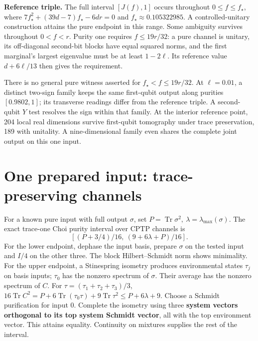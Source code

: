 \documentclass[
  10pt,
  a4paper,
]{article}
\begin{document}
\textbf{Reference triple.} The full interval \([J(f),1]\) occurs throughout \(0\le f\le f_\star\), where \(7f_\star^2+(39d-7)f_\star-6dr=0\) and \(f_\star\approx0.105322985\). A controlled-unitary construction attains the pure endpoint in this range. Some ambiguity survives throughout \(0<f<r\). Purity one requires \(f\le19r/32\): a pure channel is unitary, its off-diagonal second-bit blocks have equal squared norms, and the first marginal's largest eigenvalue must be at least \(1-2\ell\). Its reference value \(d+6\ell/13\) then gives the requirement.

There is no general pure witness asserted for \(f_\star<f\le19r/32\). At \(\ell=0.01\), a distinct two-sign family keeps the same first-qubit output along purities \([0.9802,1]\); its transverse readings differ from the reference triple. A second-qubit \(Y\) test resolves the sign within that family. At the interior reference point, 204 local real dimensions survive first-qubit tomography under trace preservation, 189 with unitality. A nine-dimensional family even shares the complete joint output on this one input.

\newpage

\section{One prepared input: trace-preserving channels}\label{one-prepared-input-trace-preserving-channels}

For a known pure input with full output \(\sigma\), set \(P=\operatorname{Tr}\sigma^2,\ \lambda=\lambda_{\max}(\sigma)\). The exact trace-one Choi purity interval over CPTP channels is \[
 [(P+3/4)/16,\ (9+6\lambda+P)/16].
\] For the lower endpoint, dephase the input basis, prepare \(\sigma\) on the tested input and \(I/4\) on the other three. The block Hilbert--Schmidt norm shows minimality. For the upper endpoint, a Stinespring isometry produces environmental states \(\tau_j\) on basis inputs; \(\tau_0\) has the nonzero spectrum of \(\sigma\). Their average has the nonzero spectrum of \(C\). For \(\tau=(\tau_1+\tau_2+\tau_3)/3\), \(16\operatorname{Tr}C^2=P+6\operatorname{Tr}(\tau_0\tau)+9\operatorname{Tr}\tau^2\le P+6\lambda+9\). Choose a Schmidt purification for input 0. Complete the isometry using three \textbf{system vectors orthogonal to its top system Schmidt vector}, all with the top environment vector. This attains equality. Continuity on mixtures supplies the rest of the interval.
\end{document}
